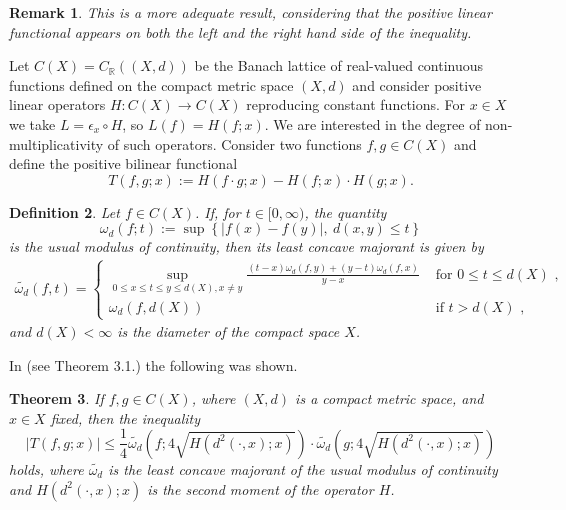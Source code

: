 \documentclass[12pt,leqno,a4paper,dvips,twoside]{article}
\newcommand*{\R}{\ensuremath{\mathbb{R}}}               %
\newtheorem{thm}{Theorem}[section]
\newtheorem{defin}[thm]{Definition}
\newtheorem{rema}[thm]{Remark}%
\begin{document}
{\begin{rema}
	This is a more adequate result, considering that the positive linear functional appears on both the left and the right hand side of the inequality.
\end{rema}

Let $C(X)=C_{\R}((X,d))$ be the Banach lattice of real-valued continuous functions defined on the compact metric space $(X,d)$ and consider positive linear operators $H:C(X)\to C(X)$ reproducing constant functions. For $x\in X$ we take $L=\epsilon_x\circ H$, so $L(f)=H(f;x)$. We are interested in the degree of non-multiplicativity of such operators. Consider two functions $f,g\in C(X)$ and define
the positive bilinear functional 
	\begin{equation*}
		T(f,g;x):=H(f\cdot g;x)-H(f;x)\cdot H(g;x).
	\end{equation*}

\begin{defin}
	Let $f\in C(X)$. If, for $t\in [0,\infty)$, the quantity
		\begin{equation*}
			\omega_d(f;t):=\sup\left\{\left|f(x)-f(y)\right|,\ d(x,y)\leq t\right\}
		\end{equation*}
	is the usual modulus of continuity, then its least concave majorant is given by
		\begin{align*}
		\widetilde{\omega_d}(f,t)=
			\begin{cases}
\sup_{0\leq x\leq t\leq y\leq d(X),x\neq y}\frac{(t-x)\omega_d(f,y)+(y-t)\omega_d(f,x)}{y-x} & \text{ for } 0\leq t\leq d(X) \text{ , }\\
\omega_d(f,d(X)) & \text{ if } t > d(X)\text{ , }
			\end{cases}
	\end{align*}		
	and $d(X)<\infty$ is the diameter of the compact space $X$.
\end{defin}

In \cite{rusu:2011} (see Theorem 3.1.) the following was shown.
\begin{thm}\label{th2}
	If $f,g\in C(X)$, where $(X,d)$ is a compact metric space, and $x\in X$ fixed, then the inequality
		\begin{equation*}
			\left|T(f,g;x)\right|
			\leq \frac{1}{4}\widetilde{\omega_d}\left(f;4\sqrt{H(d^2(\cdot,x);x)}\right)\cdot
			\widetilde{\omega_d}\left(g;4\sqrt{H(d^2(\cdot,x);x)}\right)
		\end{equation*}	
	holds, where $\widetilde{\omega_d}$ is the least concave majorant of the usual modulus of continuity  		and $H(d^2(\cdot,x);x)$ is the second moment of the operator $H$.
\end{thm}

}
\end{document}

